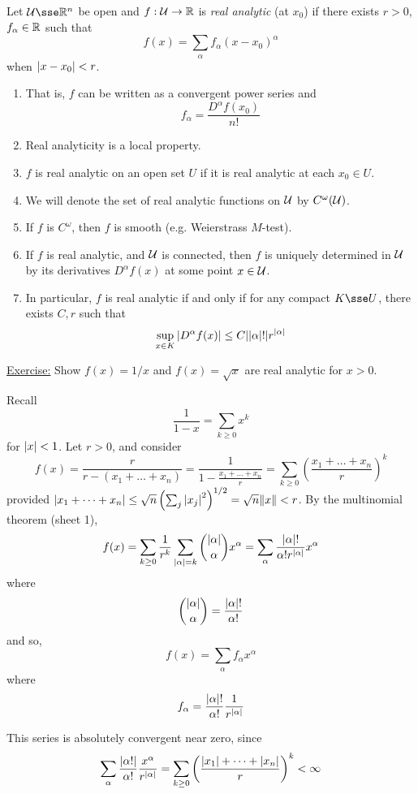 \documentclass{article}
\begin{document}
\begin{definition}
    Let \(\mcU \sse \R^n\) be open and \(f : \mathcal{U} \to \mathbb{R}\) is \emph{real analytic} (at \(x_0\)) if there exists \(r > 0\), \(f_\alpha \in \mathbb{R}\) such that
    \[f(x) = \sum_{\alpha}f_\alpha(x-x_0)^\alpha\]
    when \(\abs{x - x_0} < r\). 
\end{definition}

\begin{remark}
    \begin{enumerate}
        \item That is, \(f\) can be written as a convergent power series and
        \[f_\alpha = \frac{D^\alpha f(x_0)}{n!}\]
        \item Real analyticity is a local property.
        \item \(f\) is real analytic on an open set \(U\) if it is real analytic at each \(x_0 \in U\).
        \item We will denote the set of real analytic functions on \(\mathcal{U}\) by \(C^\omega(\mathcal{U})\).
        \item If \(f\) is \(C^\omega\), then \(f\) is smooth (e.g. Weierstrass \(M\)-test).
        \item If \(f\) is real analytic, and \(\mathcal{U}\) is connected, then \(f\) is uniquely determined in \(\mathcal{U}\) by its derivatives \(D^\alpha f(x)\) at some point \(x \in \mathcal{U}\).
        \item In particular, \(f\) is real analytic if and only if for any compact \(K \sse U\), there exists \(C, r\) such that
        \[\sup_{x \in K}\abs{D^\alpha f(x)} \le C\abs{\abs{\alpha}!}{r^{\abs{\alpha}}}\]
    \end{enumerate}
\end{remark}

\underline{Exercise:} Show \(f(x) = 1/x\) and \(f(x) =\sqrt{x}\) are real analytic for \(x > 0\).

\begin{example}
    Recall
    \[\frac{1}{1-x} = \sum_{k \ge 0}x^k\]
    for \(\abs{x} < 1\). Let \(r > 0\), and consider
    \[f(x) = \frac{r}{r - (x_1 + \dots + x_n)} = \frac{1}{1- \frac{x_1 + \dots + x_n}{r}} = \sum_{k \ge 0}\left(\frac{x_1 + \dots + x_n}{r}\right)^k\]
    provided \(\abs{x_1 + \dots + x_n} \le \sqrt n\left(\sum_j \abs{x_j}^2\right)^{1/2} = \sqrt n \norm{x} < r\).
    By the multinomial theorem (sheet 1),
    \[f(x) = \sum_{k \ge 0}\frac{1}{r^k}\sum_{\abs{\alpha} = k}{\abs{\alpha}\choose \alpha}x^\alpha = \sum_\alpha \frac{\abs{\alpha}!}{\alpha!r^{\abs{\alpha}}}x^\alpha\]
    where
    \[{\abs{\alpha}\choose\alpha} = \frac{\abs{\alpha}!}{\alpha!}\]
    and so,
    \[f(x) = \sum_\alpha f_\alpha x^\alpha\]
    where
    \[f_\alpha = \frac{\abs{\alpha}!}{\alpha!}\frac{1}{r^{\abs{\alpha}}}\]

    This series is absolutely convergent near zero, since
    \[\sum_\alpha \frac{\abs{\alpha!}}{\alpha!}\frac{x^\alpha}{r^{\abs{\alpha}}} = \sum_{k \ge 0}\left(\frac{\abs{x_1} + \dots + \abs{x_n}}{r}\right)^k < \infty\]
\end{example}
\end{document}
